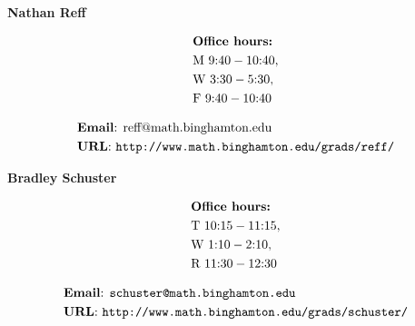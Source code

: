 \documentclass[11pt]{article}
\begin{document}
\begin{center}{\Huge \bf Nathan Reff}\end{center}

\begin{align*}
&\text{{\bf Office hours:}} \\
&\text{M }  9{:}40-10{:}40, \\ 
&\text{W }  3{:}30-5{:}30, \\
&\text{F }  9{:}40-10{:}40
\end{align*}


\begin{align*}
&\text{{\bf Email}: reff@math.binghamton.edu} \\
&\text{{\bf URL}: \tt{http://www.math.binghamton.edu/grads/reff/}}
\end{align*}


\begin{center}

\end{center}


\vspace{10pc}

\begin{center}{\Huge \bf Bradley Schuster}\end{center}

\begin{align*}
&\text{{\bf Office hours:}} \\
&\text{T }  10{:}15-11{:}15, \\ 
&\text{W }  1{:}10-2{:}10, \\
&\text{R }  11{:}30-12{:}30
\end{align*}

\begin{align*}
&\text{{\bf Email}: \tt{schuster@math.binghamton.edu}} \\
&\text{{\bf URL}: \tt{http://www.math.binghamton.edu/grads/schuster/}} 
\end{align*}
\end{document}
